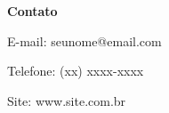 \documentclass[t]{beamer}
\begin{document}
{
\begin{frame}[plain]
\vspace{15mm}
\begin{center}
\textcolor{cinza}{
\textbf{Contato}
}
\end{center}
\vspace{-6mm}
\begin{center}
\textcolor{cinza}{\scriptsize{
E-mail: seunome@email.com
}}
\end{center}
\vspace{-6mm}
\begin{center}
\textcolor{cinza}{\scriptsize{
Telefone: (xx) xxxx-xxxx
}}
\end{center}
\vspace{-6mm}
\begin{center}
\textcolor{cinza}{\scriptsize{
Site: www.site.com.br
}}
\end{center}
\end{frame}
}
\end{document}
